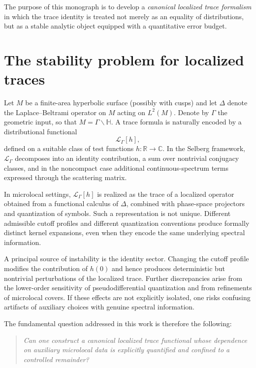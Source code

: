 The purpose of this monograph is to develop a \emph{canonical localized trace formalism} in which the trace identity
is treated not merely as an equality of distributions, but as a stable analytic object equipped with a quantitative
error budget.

\section{The stability problem for localized traces}
\label{sec:01.problem}

Let $M$ be a finite-area hyperbolic surface (possibly with cusps) and let $\Delta$ denote the Laplace--Beltrami
operator on $M$ acting on $L^2(M)$.  Denote by $\Gamma$ the geometric input, so that $M=\Gamma\backslash\mathbb{H}$.
A trace formula is naturally encoded by a distributional functional
\[
\mathcal{L}_\Gamma[h],
\]
defined on a suitable class of test functions $h:\mathbb{R}\to\mathbb{C}$.
In the Selberg framework, $\mathcal{L}_\Gamma$ decomposes into an identity contribution, a sum over nontrivial
conjugacy classes, and in the noncompact case additional continuous-spectrum terms expressed through the scattering
matrix.

In microlocal settings, $\mathcal{L}_\Gamma[h]$ is realized as the trace of a localized operator obtained from a
functional calculus of $\Delta$, combined with phase-space projectors and quantization of symbols.
Such a representation is not unique.  Different admissible cutoff profiles and different quantization conventions
produce formally distinct kernel expansions, even when they encode the same underlying spectral information.

A principal source of instability is the identity sector.  Changing the cutoff profile modifies the contribution of
$h(0)$ and hence produces deterministic but nontrivial perturbations of the localized trace.  Further discrepancies
arise from the lower-order sensitivity of pseudodifferential quantization and from refinements of microlocal covers.
If these effects are not explicitly isolated, one risks confusing artifacts of auxiliary choices with genuine
spectral information.

The fundamental question addressed in this work is therefore the following:

\begin{quote}
\emph{Can one construct a canonical localized trace functional whose dependence on auxiliary microlocal data is
explicitly quantified and confined to a controlled remainder?}
\end{quote}

